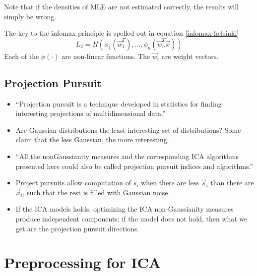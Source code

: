 \documentclass[]{article}
\begin{document}
Note that if the densities of MLE are not estimated correctly, the results will simply be wrong.  

The key to the infomax principle is spelled out in equation \ref{infomax-helsinki}
\begin{equation}
L_2 = H ( \phi _1 (\vec{w}_1^T), ..., \phi_n ( \vec{w}_n ^T \vec{x})) \label{infomax-helsinki}
\end{equation}
Each of the $\phi(\cdot)$ are non-linear functions.  The $\vec{w}_i$ are weight vectors.  


\subsection{Projection Pursuit}
\begin{itemize}

	\item ``Projection pursuit is a technique developed in statistics for finding interesting projections of multidimensional data.''  
	\item Are Gaussian distributions the least interesting set of distributions?  Some claim that the less Gaussian, the more interesting.  
	\item ``All the nonGaussianity measures and the corresponding ICA algorithms presented here could also be called projection pursuit indices and algorithms.''
	\item Project pursuits allow computation of $s_i$ when there are less $\vec{s}_i$ than there are $\vec{x}_i$, such that the rest is filled with Gaussian noise.
	\item If the ICA models holds, optimizing the ICA non-Gaussianity measures produce independent components;  if the model does not hold, then what we get are the projection pursuit directions.
\end{itemize}



\section{Preprocessing for ICA}
\end{document}
